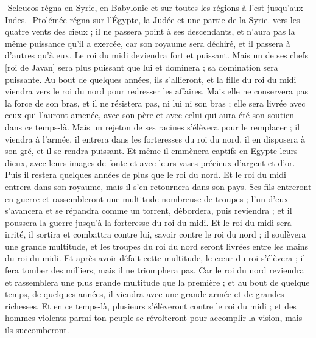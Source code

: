 \begin{multicols}{2}
{-Seleucos régna en Syrie, en Babylonie et sur toutes les régions à l'est jusqu'aux Indes. 
-Ptolémée régna sur l'Égypte, la Judée et une partie de la Syrie.} vers les quatre vents des cieux ; il ne passera point à ses descendants, et n'aura pas la même puissance qu'il a exercée, car son royaume sera déchiré, et il passera à d'autres qu'à eux.
Le roi du midi deviendra fort et puissant. Mais un de ses chefs [roi de Javan] sera plus puissant que lui et dominera ; sa domination sera puissante.
Au bout de quelques années, ils s'allieront, et la fille du roi du midi viendra vers le roi du nord pour redresser les affaires. Mais elle ne conservera pas la force de son bras, et il ne résistera pas, ni lui ni son bras ; elle sera livrée avec ceux qui l'auront amenée, avec son père et avec celui qui aura été son soutien dans ce temps-là.
Mais un rejeton de ses racines s'élèvera pour le remplacer ; il viendra à l'armée, il entrera dans les forteresses du roi du nord, il en disposera à son gré, et il se rendra puissant.
Et même il emmènera captifs en Egypte leurs dieux, avec leurs images de fonte et avec leurs vases précieux d'argent et d'or. Puis il restera quelques années de plus que le roi du nord.
Et le roi du midi entrera dans son royaume, mais il s'en retournera dans son pays.
Ses fils entreront en guerre et rassembleront une multitude nombreuse de troupes ; l'un d'eux s'avancera et se répandra comme un torrent, débordera, puis reviendra ; et il poussera la guerre jusqu'à la forteresse du roi du midi.
Et le roi du midi sera irrité, il sortira et combattra contre lui, savoir contre le roi du nord ; il soulèvera une grande multitude, et les troupes du roi du nord seront livrées entre les mains du roi du midi.
Et après avoir défait cette multitude, le cœur du roi s'élèvera ; il fera tomber des milliers, mais il ne triomphera pas.
Car le roi du nord reviendra et rassemblera une plus grande multitude que la première ; et au bout de quelque temps, de quelques années, il viendra avec une grande armée et de grandes richesses.
Et en ce temps-là, plusieurs s'élèveront contre le roi du midi ; et des hommes violents parmi ton peuple se révolteront pour accomplir la vision, mais ils succomberont.

\end{multicols}

